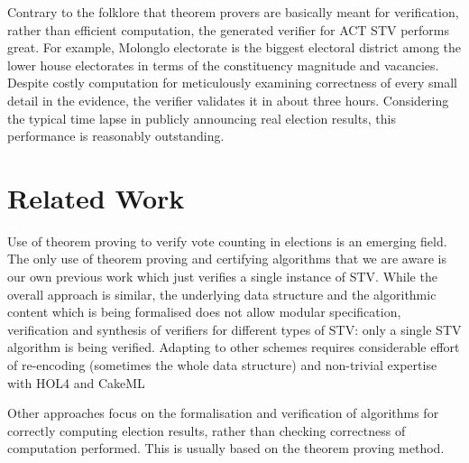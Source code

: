 \documentclass[10pt,conference]{IEEEtran}
\begin{document}
Contrary to the folklore that theorem provers are basically meant for verification, rather than efficient computation, the generated verifier for ACT STV performs great. For example, Molonglo electorate is the biggest electoral district among the lower house electorates in terms of the constituency magnitude and vacancies. Despite  costly computation for meticulously examining correctness of every small detail in the evidence, the verifier validates it in about three hours. Considering the typical time lapse in publicly announcing real election results, this performance is reasonably outstanding.  
\section{Related Work}

Use of theorem proving to verify vote counting in elections
is an emerging field. The only use of theorem proving and certifying algorithms that we are aware is our own previous work \cite{GhaleVSTTE} which just verifies a single instance of STV.  While the overall approach is similar, 
the underlying data structure and the algorithmic content which is being formalised does not allow modular specification, verification and synthesis of 
verifiers for different types of STV: only a single STV algorithm is being verified.  Adapting to other schemes
requires considerable effort of re-encoding (sometimes the whole data structure) and non-trivial expertise with HOL4 and CakeML

Other approaches focus on the  formalisation and verification of algorithms for correctly computing election results, rather than checking correctness of computation performed. This is usually based on the theorem proving method.
\end{document}
